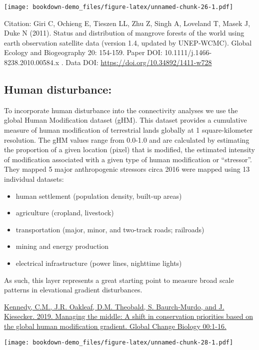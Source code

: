 \documentclass[
]{book}
\providecommand{\tightlist}{%
  \setlength{\itemsep}{0pt}\setlength{\parskip}{0pt}}
\begin{document}
\texttt{[image: bookdown-demo\_files/figure-latex/unnamed-chunk-26-1.pdf]}

Citation:
Giri C, Ochieng E, Tieszen LL, Zhu Z, Singh A, Loveland T, Masek J, Duke N (2011). Status and distribution of mangrove forests of the world using earth observation satellite data (version 1.4, updated by UNEP-WCMC). Global Ecology and Biogeography 20: 154-159. Paper DOI: 10.1111/j.1466-8238.2010.00584.x . Data DOI: \url{https://doi.org/10.34892/1411-w728}

\hypertarget{human-disturbance}{%
\subsection{Human disturbance:}\label{human-disturbance}}

To incorporate human disturbance into the connectivity analyses we use the global Human Modification dataset (gHM). This dataset provides a cumulative measure of human modification of terrestrial lands globally at 1 square-kilometer resolution. The gHM values range from 0.0-1.0 and are calculated by estimating the proportion of a given location (pixel) that is modified, the estimated intensity of modification associated with a given type of human modification or ``stressor''. They mapped 5 major anthropogenic stressors circa 2016 were mapped using 13 individual datasets:

\begin{itemize}
\tightlist
\item
  human settlement (population density, built-up areas)
\item
  agriculture (cropland, livestock)
\item
  transportation (major, minor, and two-track roads; railroads)
\item
  mining and energy production
\item
  electrical infrastructure (power lines, nighttime lights)
\end{itemize}

As such, this layer represents a great starting point to measure broad scale patterns in elevational gradient disturbances.

\href{https://onlinelibrary.wiley.com/doi/10.1111/gcb.14549}{Kennedy, C.M., J.R. Oakleaf, D.M. Theobald, S. Baurch-Murdo, and J. Kiesecker. 2019. Managing the middle: A shift in conservation priorities based on the global human modification gradient. Global Change Biology 00:1-16.}

\texttt{[image: bookdown-demo\_files/figure-latex/unnamed-chunk-28-1.pdf]}
\end{document}
